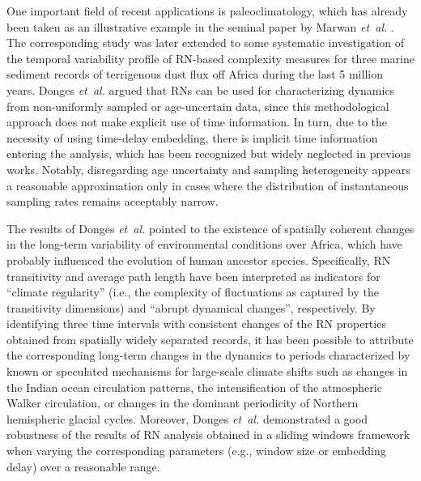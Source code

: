 \documentclass[graybox]{svmult}
\begin{document}
One important field of recent applications is paleoclimatology, which has already been taken as an illustrative example in the seminal paper by Marwan \textit{et~al.} \cite{Marwan2009}. The corresponding study was later extended to some systematic investigation of the temporal variability profile of RN-based complexity measures for three marine sediment records of terrigenous dust flux off Africa during the last 5 million years. Donges \textit{et~al.} \cite{Donges2011NPG} argued that RNs can be used for characterizing dynamics from non-uniformly sampled or age-uncertain data, since this methodological approach does not make explicit use of time information. In turn, due to the necessity of using time-delay embedding, there is implicit time information entering the analysis, which has been recognized but widely neglected in previous works. Notably, disregarding age uncertainty and sampling heterogeneity appears a reasonable approximation only in cases where the distribution of instantaneous sampling rates remains acceptably narrow. 

The results of Donges \textit{et~al.} \cite{Donges2011PNAS} pointed to the existence of spatially coherent changes in the long-term variability of environmental conditions over Africa, which have probably influenced the evolution of human ancestor species. Specifically, RN transitivity and average path length have been interpreted as indicators for ``climate regularity'' (i.e., the complexity of fluctuations as captured by the transitivity dimensions) and ``abrupt dynamical changes'', respectively. By identifying three time intervals with consistent changes of the RN properties obtained from spatially widely separated records, it has been possible to attribute the corresponding long-term changes in the dynamics to periods characterized by known or speculated mechanisms for large-scale climate shifts such as changes in the Indian ocean circulation patterns, the intensification of the atmospheric Walker circulation, or changes in the dominant periodicity of Northern hemispheric glacial cycles. Moreover, Donges \textit{et~al.} \cite{Donges2011NPG} demonstrated a good robustness of the results of RN analysis obtained in a sliding windows framework when varying the corresponding parameters (e.g., window size or embedding delay) over a reasonable range.
\end{document}
